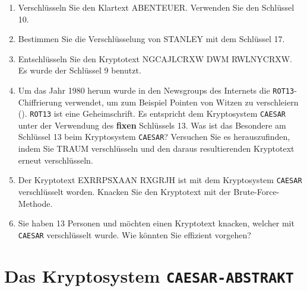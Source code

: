 \begin{enumerate}
\item Verschlüsseln Sie den Klartext ABENTEUER. Verwenden Sie den Schlüssel \num{10}.

\fillwithlines{0.25in}

\item Bestimmen Sie die Verschlüsselung von STANLEY mit dem Schlüssel \num{17}.

\fillwithlines{0.25in}

\item Entschlüsseln Sie den Kryptotext NGCAJLCRXW DWM RWLNYCRXW. Es wurde der Schlüssel \num{9} benutzt.


\fillwithlines{0.25in}

\item Um das Jahr 1980 herum wurde in den Newsgroups des Internets die \texttt{ROT13}-Chiffrierung verwendet, um zum Beispiel Pointen von Witzen zu verschleiern (). \texttt{ROT13} ist eine Geheimschrift. Es entspricht dem Kryptosystem \texttt{CAESAR} unter der Verwendung des \textbf{fixen} Schlüssels \num{13}. Was ist das Besondere am Schlüssel \num{13} beim Kryptosystem \texttt{CAESAR}? Versuchen Sie es herauszufinden, indem Sie TRAUM verschlüsseln und den daraus resultierenden Kryptotext erneut verschlüsseln.

\fillwithlines{2in}

\item Der Kryptotext EXRRPSXAAN RXGRJH ist mit dem Kryptosystem \texttt{CAESAR} verschlüsselt worden. Knacken Sie den Kryptotext mit der Brute-Force-Methode.


\fillwithlines{0.75in}

\item Sie haben \num{13} Personen und möchten einen Kryptotext knacken, welcher mit \texttt{CAESAR} verschlüsselt wurde. Wie könnten Sie effizient vorgehen?


\end{enumerate}

\newpage

\section{Das Kryptosystem \texttt{CAESAR-ABSTRAKT}}
\label{sec-caesar-abstract}


